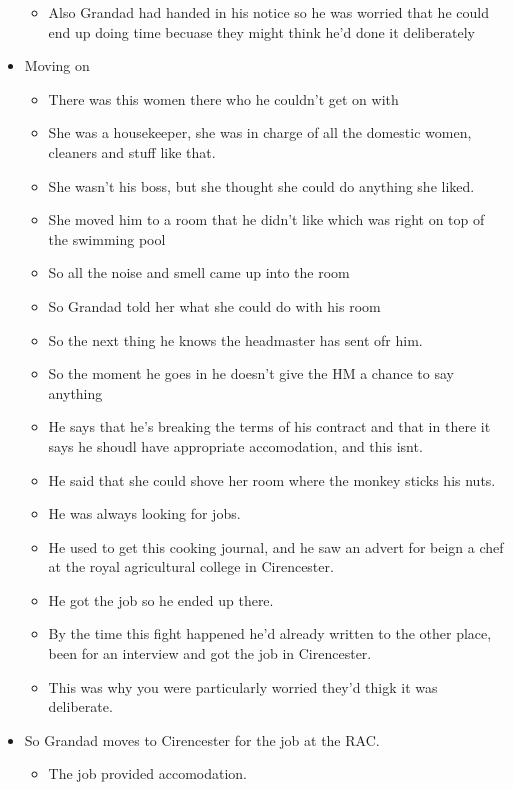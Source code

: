 \documentclass[10pt,twocolumn,letterpaper]{article}
\begin{document}
\begin{itemize}
\begin{itemize}
        \item Also Grandad had handed in his notice so he was worried that he could end up doing time becuase they might think he'd done it deliberately
    \end{itemize}
    \item Moving on
    \begin{itemize}
        \item There was this women there who he couldn't get on with
        \item She was a housekeeper, she was in charge of all the domestic  women, cleaners and stuff like that.
        \item She wasn't his boss, but she thought she could do anything she liked.
        \item She moved him to a room that he didn't like which was right on top of the swimming pool
        \item So all the noise and smell came up into the room
        \item So Grandad told her what she could do with his room
        \item So the next thing he knows the headmaster has sent ofr him.
        \item So the moment he goes in he doesn't give the HM a chance to say anything
        \item He says that he's breaking the terms of his contract and that in there it says he shoudl have appropriate accomodation, and this isnt.
        \item He said that she could shove her room where the monkey sticks his nuts.
        \item He was always looking for jobs.
        \item He used to get this cooking journal, and he saw an advert for beign a chef at the royal agricultural college in Cirencester.
        \item He got the job so he ended up there.
        \item By the time this fight happened he'd already written to the other place, been for an interview and got the job in Cirencester.
        \item This was why you were particularly worried they'd thigk it was deliberate.
    \end{itemize}
    \item So Grandad moves to Cirencester for the job at the RAC.
    \begin{itemize}
        \item The job provided accomodation.

\end{itemize}
\end{itemize}
\end{document}
